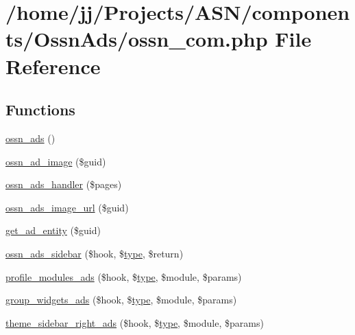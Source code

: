 \hypertarget{_ossn_ads_2ossn__com_8php}{}\section{/home/jj/\+Projects/\+A\+S\+N/components/\+Ossn\+Ads/ossn\+\_\+com.php File Reference}
\label{_ossn_ads_2ossn__com_8php}
\subsection*{Functions}
\begin{DoxyCompactItemize}
\item 
\hyperlink{_ossn_ads_2ossn__com_8php_abb5e396d4517140672f422035a10ed17}{ossn\+\_\+ads} ()
\item 
\hyperlink{_ossn_ads_2ossn__com_8php_a58cdc93f0ccc32fdbdcc40192fa2064a}{ossn\+\_\+ad\+\_\+image} (\$guid)
\item 
\hyperlink{_ossn_ads_2ossn__com_8php_a456716970d0e71c4b52bf6a01ce60e2e}{ossn\+\_\+ads\+\_\+handler} (\$pages)
\item 
\hyperlink{_ossn_ads_2ossn__com_8php_a68cd9ffccae4c76e8f5d7c4dca914c72}{ossn\+\_\+ads\+\_\+image\+\_\+url} (\$guid)
\item 
\hyperlink{_ossn_ads_2ossn__com_8php_a82c374c0343992ad410c0490a1d62132}{get\+\_\+ad\+\_\+entity} (\$guid)
\item 
\hyperlink{_ossn_ads_2ossn__com_8php_abedafbed3fc3f9c0c842293440f6be9c}{ossn\+\_\+ads\+\_\+sidebar} (\$hook, \$\hyperlink{_ossn_wall_2actions_2wall_2post_2group_8php_a2dc1bb4e1ed0029daa81ac0776b14b51}{type}, \$return)
\item 
\hyperlink{_ossn_ads_2ossn__com_8php_abe6195ac797b8a0c1061eee7ca131789}{profile\+\_\+modules\+\_\+ads} (\$hook, \$\hyperlink{_ossn_wall_2actions_2wall_2post_2group_8php_a2dc1bb4e1ed0029daa81ac0776b14b51}{type}, \$module, \$params)
\item 
\hyperlink{_ossn_ads_2ossn__com_8php_a0f85b6797b6291ecddf6e99081258e29}{group\+\_\+widgets\+\_\+ads} (\$hook, \$\hyperlink{_ossn_wall_2actions_2wall_2post_2group_8php_a2dc1bb4e1ed0029daa81ac0776b14b51}{type}, \$module, \$params)
\item 
\hyperlink{_ossn_ads_2ossn__com_8php_ac46617764152fd7f973752577e92b352}{theme\+\_\+sidebar\+\_\+right\+\_\+ads} (\$hook, \$\hyperlink{_ossn_wall_2actions_2wall_2post_2group_8php_a2dc1bb4e1ed0029daa81ac0776b14b51}{type}, \$module, \$params)
\end{DoxyCompactItemize}
